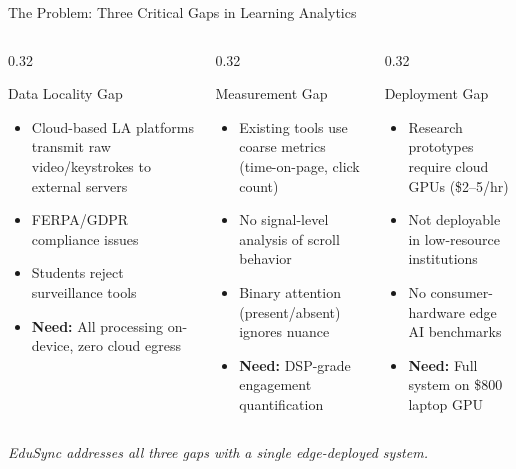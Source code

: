 \documentclass[aspectratio=169,10pt]{beamer}
\begin{document}
\begin{frame}{The Problem: Three Critical Gaps in Learning Analytics}
\begin{columns}[T]
\begin{column}{0.32\textwidth}
\begin{alertblock}{\centering Data Locality Gap}
\begin{itemize}\scriptsize
  \item Cloud-based LA platforms transmit raw video/keystrokes to external servers
  \item FERPA/GDPR compliance issues
  \item Students reject surveillance tools
  \item \textbf{Need:} All processing on-device, zero cloud egress
\end{itemize}
\end{alertblock}
\end{column}

\begin{column}{0.32\textwidth}
\begin{alertblock}{\centering Measurement Gap}
\begin{itemize}\scriptsize
  \item Existing tools use coarse metrics (time-on-page, click count)
  \item No signal-level analysis of scroll behavior
  \item Binary attention (present/absent) ignores nuance
  \item \textbf{Need:} DSP-grade engagement quantification
\end{itemize}
\end{alertblock}
\end{column}

\begin{column}{0.32\textwidth}
\begin{alertblock}{\centering Deployment Gap}
\begin{itemize}\scriptsize
  \item Research prototypes require cloud GPUs (\$2--5/hr)
  \item Not deployable in low-resource institutions
  \item No consumer-hardware edge AI benchmarks
  \item \textbf{Need:} Full system on \$800 laptop GPU
\end{itemize}
\end{alertblock}
\end{column}
\end{columns}

\vspace{6pt}
\begin{center}
\footnotesize\textit{EduSync addresses all three gaps with a single edge-deployed system.}
\end{center}
\end{frame}
\end{document}
